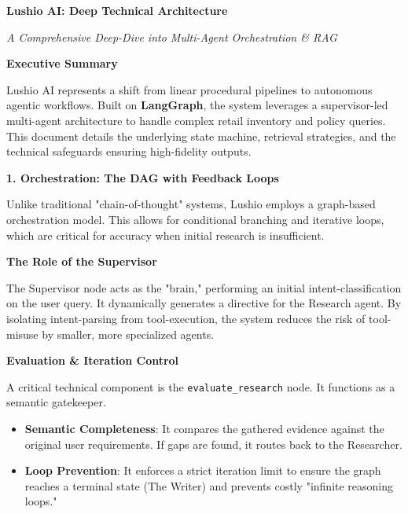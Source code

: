 \documentclass[11pt,a4paper]{article}
\newcommand{\mysection}[1]{%
    \vspace{0.4cm}%
    {\color{lushioblue}\Large\bfseries #1}%
    \par\vspace{0.2cm}%
}
\newcommand{\mysubsection}[1]{%
    \vspace{0.3cm}%
    {\color{pwcgrey}\large\bfseries #1}%
    \par\vspace{0.1cm}%
}
\begin{document}
\begin{center}
    {\Huge \textbf{Lushio AI: Deep Technical Architecture}} \par
    \vspace{0.5cm}
    {\large \textit{A Comprehensive Deep-Dive into Multi-Agent Orchestration \& RAG}} \par
    \vspace{1cm}
\end{center}

\mysection{Executive Summary}
Lushio AI represents a shift from linear procedural pipelines to autonomous agentic workflows. Built on \textbf{LangGraph}, the system leverages a supervisor-led multi-agent architecture to handle complex retail inventory and policy queries. This document details the underlying state machine, retrieval strategies, and the technical safeguards ensuring high-fidelity outputs.

\mysection{1. Orchestration: The DAG with Feedback Loops}
Unlike traditional "chain-of-thought" systems, Lushio employs a graph-based orchestration model. This allows for conditional branching and iterative loops, which are critical for accuracy when initial research is insufficient.

\mysubsection{The Role of the Supervisor}
The Supervisor node acts as the "brain," performing an initial intent-classification on the user query. It dynamically generates a directive for the Research agent. By isolating intent-parsing from tool-execution, the system reduces the risk of tool-misuse by smaller, more specialized agents.

\mysubsection{Evaluation \& Iteration Control}
A critical technical component is the \texttt{evaluate\_research} node. It functions as a semantic gatekeeper. 
\begin{itemize}
    \item \textbf{Semantic Completeness}: It compares the gathered evidence against the original user requirements. If gaps are found, it routes back to the Researcher.
    \item \textbf{Loop Prevention}: It enforces a strict iteration limit to ensure the graph reaches a terminal state (The Writer) and prevents costly "infinite reasoning loops."
\end{itemize}
\end{document}

